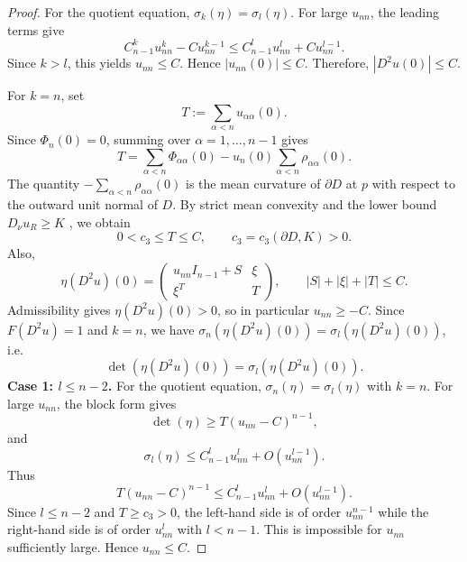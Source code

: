 \documentclass[10pt,a4paper]{amsart}
\begin{document}
\begin{proof}
		For the quotient equation, $\sigma_k(\eta) = \sigma_l(\eta)$. For large $u_{nn}$, the leading terms give
		\[
		C_{n-1}^k  u_{nn}^k - C u_{nn}^{k-1} \le C_{n-1}^l  u_{nn}^l + C u_{nn}^{l-1}.
		\]
		Since $k > l$, this yields $u_{nn} \le C$. Hence $|u_{nn}(0)| \le C$. Therefore, $|D^2 u(0)| \le C$.
		
		For $k=n$, set
		\[
		T := \sum_{\alpha < n} u_{\alpha\alpha}(0).
		\]
		Since $\Phi_n(0) = 0$, summing  over $\alpha = 1, \dots, n-1$ gives
		\[
		T = \sum_{\alpha < n} \Phi_{\alpha\alpha}(0) - u_n(0) \sum_{\alpha < n} \rho_{\alpha\alpha}(0).
		\]
		The quantity $-\sum_{\alpha < n} \rho_{\alpha\alpha}(0)$ is the mean curvature of $\partial D$ at $p$ with respect to the outward unit normal of $D$. By strict mean convexity and the lower bound $D_\nu u_R \ge K$ , we obtain
		\[
		0 < c_3 \le T \le C, \qquad c_3 = c_3(\partial D, K) > 0.
		\]
		Also,
		\[
		\eta(D^2 u)(0) = \begin{pmatrix}
			u_{nn} I_{n-1} + S & \xi \\
			\xi^T & T
		\end{pmatrix},
		\qquad |S| + |\xi|+|T| \le C.
		\]
		Admissibility gives $\eta(D^2 u)(0) > 0$, so in particular $u_{nn} \ge -C$. Since $F(D^2 u) = 1$ and $k=n$, we have $\sigma_n(\eta(D^2 u)(0)) = \sigma_l(\eta(D^2 u)(0))$, i.e.
		\[
		\det(\eta(D^2 u)(0)) = \sigma_l(\eta(D^2 u)(0)).
		\]
		\noindent\textbf{Case 1: $l \le n-2$.}
		For the quotient equation, $\sigma_n(\eta) = \sigma_l(\eta)$ with $k=n$.
		For large $u_{nn}$, the block form gives
		\[
		\det(\eta) \ge T (u_{nn} - C)^{n-1},
		\]
		and
		\[
		\sigma_l(\eta) \le C_{n-1}^l u_{nn}^l + O(u_{nn}^{l-1}).
		\]
		Thus
		\[
		T (u_{nn} - C)^{n-1} \le C_{n-1}^l u_{nn}^l + O(u_{nn}^{l-1}).
		\]
		Since $l \le n-2$ and $T \ge c_3 > 0$, the left-hand side is of order $u_{nn}^{n-1}$ while the right-hand side is of order $u_{nn}^l$ with $l < n-1$. This is impossible for $u_{nn}$ sufficiently large. Hence $u_{nn} \le C$.
		
		
		

\end{proof}
\end{document}
